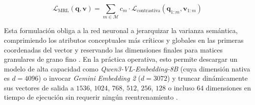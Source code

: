 \begin{equation}
\mathcal{L}_{\text{MRL}}(\mathbf{q}, \mathbf{v}) = \sum_{m \in \mathcal{M}} c_m \cdot \mathcal{L}_{\text{contrastiva}}\!\left(\mathbf{q}_{1:m}, \mathbf{v}_{1:m}\right)
\label{eq:matryoshka_loss}
\end{equation}

Esta formulación obliga a la red neuronal a jerarquizar la varianza semántica, comprimiendo los atributos conceptuales más críticos y globales en las primeras coordenadas del vector y reservando las dimensiones finales para matices granulares de grano fino \cite{learnopencv_qwen3}. En la práctica operativa, esto permite descargar un modelo de alta capacidad como \textit{Qwen3-VL-Embedding-8B} (cuya dimensión nativa es $d = 4096$) o invocar \textit{Gemini Embedding 2} ($d = 3072$) y truncar dinámicamente sus vectores de salida a $1536$, $1024$, $768$, $512$, $256$, $128$ o incluso $64$ dimensiones en tiempo de ejecución sin requerir ningún reentrenamiento \cite{learnopencv_qwen3, gemini_emb2_docs}.


